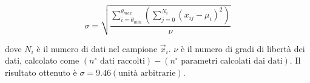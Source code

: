   \begin{equation}
    \sigma = \sqrt{
      \frac {
        \sum_{i = \theta_{min}}^{\theta_{max}} \left(
          \sum_{j = 0}^{N_i} (x_{ij} -\mu_i)^2
        \right)
      } {
        \nu
      }
    }
  \end{equation}

  \noindent dove $N_i$ è il numero di dati nel campione $\vec{x}_i$.
  $\nu$ è il numero di gradi di libertà dei dati, calcolato come
  $(n^\circ \text{ dati raccolti}) - (n^\circ \text{ parametri calcolati dai dati})$.
  Il risultato ottenuto è $\sigma = 9.46 (\text{unità arbitrarie})$.  %
\endinput

